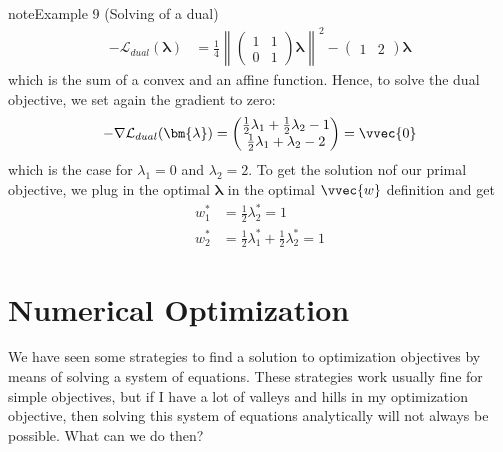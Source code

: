 \documentclass[letterpaper,10pt,english]{jupyterBook}
\begin{document}
\begin{sphinxadmonition}{note}{Example 9 (Solving of a dual)}
\begin{align*}
-\mathcal{L}_{dual}(\bm{\lambda}) &= \frac14\left\lVert \begin{pmatrix}1 & 1\\0 & 1\end{pmatrix}\bm{\lambda}\right\rVert^2 - \begin{pmatrix}1 &2 \end{pmatrix}\bm{\lambda}
\end{align*}
\sphinxAtStartPar
which is the sum of a convex and an affine function. Hence, to solve the dual objective, we set again the gradient to zero:
\begin{align*}
-\nabla\mathcal{L}_{dual}(\bm{\lambda}) = \begin{pmatrix}\frac12\lambda_1 +\frac12\lambda_2-1\\ 
\frac12\lambda_1+\lambda_2-2\end{pmatrix} = \vvec{0} 
\end{align*}
\sphinxAtStartPar
which is the case for \(\lambda_1=0\) and \(\lambda_2=2\). To get the solution nof our primal objective, we plug in the optimal \(\bm{\lambda}\) in the optimal \(\vvec{w}\) definition and get
\begin{align*}
w_1^* &= \frac12\lambda_2^* = 1\\
w_2^* &= \frac12\lambda_1^* +\frac12\lambda_2^* = 1
\end{align*}\end{sphinxadmonition}

\sphinxstepscope


\section{Numerical Optimization}
\label{\detokenize{optimization_numerical:numerical-optimization}}\label{\detokenize{optimization_numerical::doc}}
\sphinxAtStartPar
We have seen some strategies to find a solution to optimization objectives by means of solving a system of equations. These strategies work usually fine for simple objectives, but if I have a lot of valleys and hills in my optimization objective, then solving this system of equations analytically will not always be possible. What can we do then?
\end{document}
